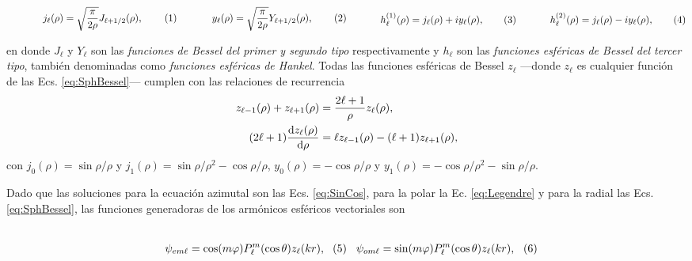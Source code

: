 	\begin{subequations}
	\eqhalf{j_\ell (\rho) = \sqrt{\frac{\pi}{2\rho}} J_{\ell+1/2}(\rho), \label{eqs:jn}}
	\eqhalf{y_\ell (\rho) = \sqrt{\frac{\pi}{2\rho}} Y_{\ell+1/2}(\rho), \label{eqs:yn}}
	\eqhalf{h_\ell^{(1)} (\rho) = j_\ell(\rho) + i y_\ell(\rho), \label{eqs:h1}}
	\eqhalf{h_\ell^{(2)} (\rho) =  j_\ell(\rho) - i y_\ell(\rho), \label{eqs:h2}}
	\label{eq:SphBessel}
	\end{subequations}

\noindent	
en donde $J_\ell$ y $Y_\ell$ son las \emph{funciones de Bessel del primer y segundo tipo} respectivamente y $h_\ell$ son las \emph{funciones esféricas de Bessel del tercer tipo}, también denominadas como \emph{funciones esféricas de Hankel}. Todas las funciones esféricas de Bessel $z_\ell$ ---donde $z_\ell$ es cualquier función de las Ecs. \eqref{eq:SphBessel}--- cumplen con las  relaciones de recurrencia
	\begin{align}
	z_{\ell-1}(\rho) + z_{\ell+1}(\rho) &=\frac{2\ell+1}{\rho} z_\ell(\rho),\\
	(2\ell + 1) \dv{z_\ell(\rho)}{\rho} &= \ell z_{\ell-1}(\rho) - (\ell+1)z_{\ell+1}(\rho),
	\end{align}
con  $j_0(\rho) = \sin\rho / \rho$ y $j_1(\rho) = \sin\rho / \rho^2- \cos\rho/\rho$, $y_0(\rho) = -\cos\rho/\rho$ y $y_1(\rho) = -\cos\rho/\rho^2-\sin\rho/\rho$.

Dado que las soluciones para la ecuación azimutal son las Ecs. \eqref{eq:SinCos}, para la polar la Ec. \eqref{eq:Legendre} y para la radial las Ecs. \eqref{eq:SphBessel}, las funciones generadoras de los armónicos esféricos vectoriales son\vspace*{-1em}

 	\begin{subequations}	\eqhalf{\psi_{em\ell} = \cos(m\varphi) P_\ell^m( \cos \theta) z_\ell(k r),}
	\eqhalf{\psi_{om\ell} = \sin(m\varphi) P_\ell^m( \cos \theta) z_\ell(k r),}
	\label{eq:psieo}	\end{subequations}

